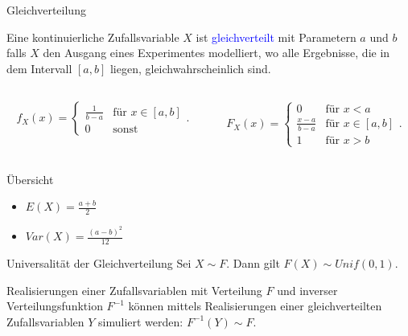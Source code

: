 \documentclass{beamer}
\def\padding{\vspace{0.5cm}}
\def\spadding{\vspace{0.25cm}}
\def\b{\textcolor{blue}}
\begin{document}
\begin{frame}{Gleichverteilung}
    \begin{definition}
        Eine kontinuierliche Zufallsvariable $X$ ist \b{gleichverteilt} mit Parametern $a$ und $b$ falls $X$ den Ausgang eines Experimentes modelliert, wo alle Ergebnisse, die in dem Intervall $[a,b]$ liegen, gleichwahrscheinlich sind.\pause
        \begin{columns}
            \begin{column}{0.5\textwidth}
               \begin{align*}
                    f_X(x) = \begin{cases}
                        \frac{1}{b - a} & \text{für $x \in [a,b]$} \\
                        0 & \text{sonst}
                    \end{cases}.
                \end{align*}
            \end{column}\pause
            \begin{column}{0.5\textwidth}
                \begin{align*}
                    F_X(x) = \begin{cases}
                        0 & \text{für $x < a$} \\
                        \frac{x - a}{b - a} & \text{für $x \in [a,b]$} \\
                        1 & \text{für $x > b$}
                    \end{cases}.
                \end{align*}
            \end{column}
        \end{columns}\pause\par\padding
        \begin{exampleblock}{Übersicht}
            \begin{itemize}
                \item $E(X) = \frac{a + b}{2}$\pause
                \item $Var(X) = \frac{(a - b)^2}{12}$
            \end{itemize}
        \end{exampleblock}
    \end{definition}
\end{frame}

\begin{frame}
    \begin{block}{Universalität der Gleichverteilung}
        Sei $X \sim F$. Dann gilt $F(X) \sim Unif(0,1)$.\pause\par\spadding
        Realisierungen einer Zufallsvariablen mit Verteilung $F$ und inverser Verteilungsfunktion $F^{-1}$ können mittels Realisierungen einer gleichverteilten Zufallsvariablen $Y$ simuliert werden: $F^{-1}(Y) \sim F$.
    \end{block}
\end{frame}
\end{document}
